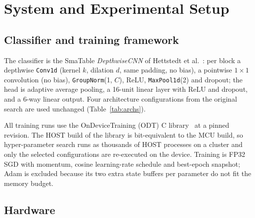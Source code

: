 \section{System and Experimental Setup}
\label{sec:system}

\subsection{Classifier and training framework}
The classifier is the SmaTable \emph{DepthwiseCNN} of Hettstedt et al.~\cite{hettstedt2026smatable}: per block a depthwise \texttt{Conv1d} (kernel $k$, dilation $d$, same padding, no bias), a pointwise $1\times1$ convolution (no bias), \texttt{GroupNorm}(1, $C$), ReLU, \texttt{MaxPool1d}(2) and dropout; the head is adaptive average pooling, a 16-unit linear layer with ReLU and dropout, and a 6-way linear output. Four architecture configurations from the original search are used unchanged (Table~\ref{tab:archs}). 

All training runs use the OnDeviceTraining (ODT) C library~\cite{odt2026} at a pinned revision. The HOST build of the library is bit-equivalent to the MCU build, so hyper-parameter search runs as thousands of HOST processes on a cluster and only the selected configurations are re-executed on the device. Training is FP32 SGD with momentum, cosine learning-rate schedule and best-epoch snapshot; Adam is excluded because its two extra state buffers per parameter do not fit the memory budget. 

\subsection{Hardware}


